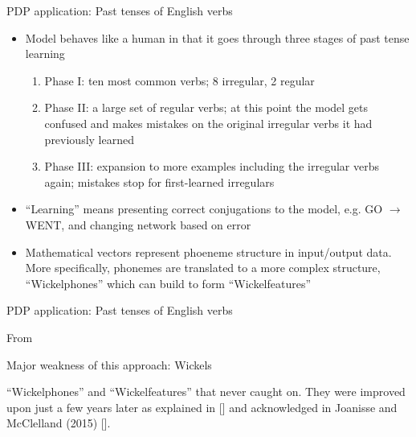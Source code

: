 \documentclass{beamer}
\begin{document}
\begin{frame}{PDP application: Past tenses of English verbs}
    \begin{itemize}
        \item Model behaves like a human in that it goes through three stages
            of past tense learning
            \begin{enumerate}
                \item Phase I: ten most common verbs; 8 irregular, 2 regular
                \item Phase II: a large set of regular verbs; at this point
                    the model gets confused and makes mistakes on the original
                    irregular verbs it had previously learned
                \item Phase III: expansion to more examples including the
                    irregular verbs again; mistakes stop for first-learned
                    irregulars
            \end{enumerate}
        \item ``Learning'' means presenting correct conjugations to the model,
            e.g. GO $\rightarrow$ WENT, and changing network based on error
        \item Mathematical vectors represent phoeneme structure in input/output
            data. More specifically, phonemes are translated to a more complex
            structure, ``Wickelphones'' which can build to form
            ``Wickelfeatures''
    \end{itemize}
\end{frame}

\begin{frame}{PDP application: Past tenses of English verbs}

    \vspace{20pt}

    From 
\end{frame}

\begin{frame}{Major weakness of this approach: Wickels}

    ``Wickelphones'' and ``Wickelfeatures'' that never caught on. They were
    improved upon just a few years later as explained in []
    and acknowledged in Joanisse and McClelland (2015)
    [].

    \vspace{20px}


\end{frame}
\end{document}
